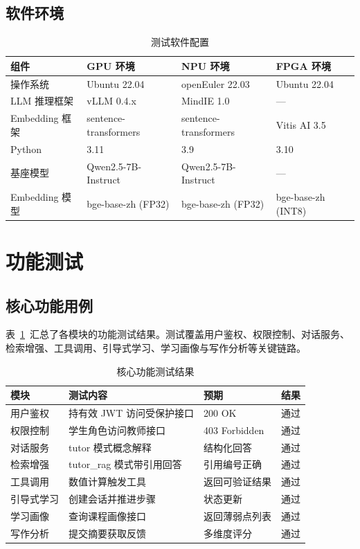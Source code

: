 \subsection{软件环境}
\begin{table}[htbp]
  \centering
  \caption{测试软件配置}
  \begin{tabular}{llll}
    \toprule
    组件 & GPU 环境 & NPU 环境 & FPGA 环境 \\
    \midrule
    操作系统 & Ubuntu 22.04 & openEuler 22.03 & Ubuntu 22.04 \\
    LLM 推理框架 & vLLM 0.4.x & MindIE 1.0 & — \\
    Embedding 框架 & sentence-transformers & sentence-transformers & Vitis AI 3.5 \\
    Python & 3.11 & 3.9 & 3.10 \\
    基座模型 & Qwen2.5-7B-Instruct & Qwen2.5-7B-Instruct & — \\
    Embedding 模型 & bge-base-zh (FP32) & bge-base-zh (FP32) & bge-base-zh (INT8) \\
    \bottomrule
  \end{tabular}
\end{table}

\section{功能测试}

\subsection{核心功能用例}
表~\ref{tab:test-cases}~汇总了各模块的功能测试结果。测试覆盖用户鉴权、权限控制、对话服务、检索增强、工具调用、引导式学习、学习画像与写作分析等关键链路。

\begin{table}[htbp]
  \centering
  \caption{核心功能测试结果}
  \label{tab:test-cases}
  \begin{tabular}{p{2.5cm}p{4.5cm}p{2cm}p{3cm}}
    \toprule
    模块 & 测试内容 & 预期 & 结果 \\
    \midrule
    用户鉴权 & 持有效 JWT 访问受保护接口 & 200 OK & 通过 \\
    权限控制 & 学生角色访问教师接口 & 403 Forbidden & 通过 \\
    对话服务 & tutor 模式概念解释 & 结构化回答 & 通过 \\
    检索增强 & tutor\_rag 模式带引用回答 & 引用编号正确 & 通过 \\
    工具调用 & 数值计算触发工具 & 返回可验证结果 & 通过 \\
    引导式学习 & 创建会话并推进步骤 & 状态更新 & 通过 \\
    学习画像 & 查询课程画像接口 & 返回薄弱点列表 & 通过 \\
    写作分析 & 提交摘要获取反馈 & 多维度评分 & 通过 \\
    \bottomrule
  \end{tabular}
\end{table}

